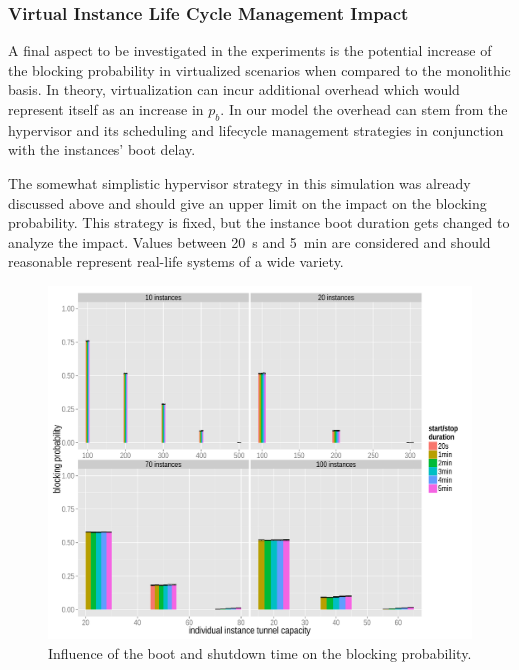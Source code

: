 \subsubsection{Virtual Instance Life Cycle Management Impact}


A final aspect to be investigated in the experiments is the potential increase of the blocking probability in virtualized scenarios when compared to the monolithic basis. In theory, virtualization can incur additional overhead which would represent itself as an increase in $p_b$. In our model the overhead can stem from the hypervisor and its scheduling  and lifecycle management strategies in conjunction with the instances' boot delay. 

The somewhat simplistic hypervisor strategy in this simulation was already discussed above and should give an upper limit on the impact on the blocking probability. This strategy is fixed, but the instance boot duration gets changed to analyze the impact. Values between \SI{20}{\second} and \SI{5}{\minute} are considered and should reasonable represent real-life systems of a wide variety.

\begin{figure}[htb]
  \centering
  \includegraphics[width=1.0\textwidth]{images/R-virtualized-startstop-blocking-barchart.pdf}
  \caption{Influence of the boot and shutdown time on the blocking probability.}
\label{c4:fig:blockprob-startstop-barchart}
\end{figure}

